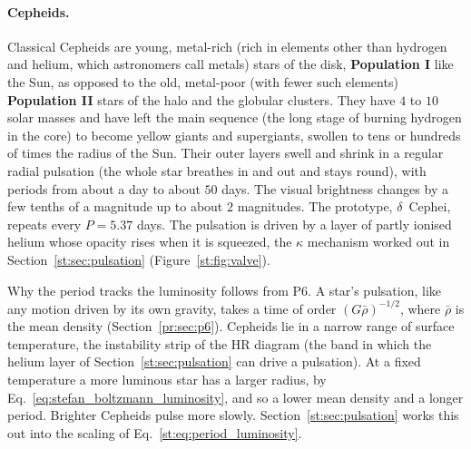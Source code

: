 \paragraph{Cepheids.} Classical Cepheids are young, metal-rich (rich in elements other than hydrogen and helium, which astronomers call metals) stars of the disk, \textbf{Population I} like the Sun, as opposed to the old, metal-poor (with fewer such elements) \textbf{Population II} stars of the halo and the globular clusters. They have $4$ to $10$ solar masses and have left the main sequence (the long stage of burning hydrogen in the core) to become yellow giants and supergiants, swollen to tens or hundreds of times the radius of the Sun. Their outer layers swell and shrink in a regular radial pulsation (the whole star breathes in and out and stays round), with periods from about a day to about $50$ days. The visual brightness changes by a few tenths of a magnitude up to about $2$ magnitudes. The prototype, $\delta$~Cephei, repeats every $P=5.37$ days. The pulsation is driven by a layer of partly ionised helium whose opacity rises when it is squeezed, the $\kappa$ mechanism worked out in Section~\ref{st:sec:pulsation} (Figure~\ref{st:fig:valve}).

Why the period tracks the luminosity follows from P6. A star's pulsation, like any motion driven by its own gravity, takes a time of order $(G\bar\rho)^{-1/2}$, where $\bar\rho$ is the mean density (Section~\ref{pr:sec:p6}). Cepheids lie in a narrow range of surface temperature, the instability strip of the HR diagram (the band in which the helium layer of Section~\ref{st:sec:pulsation} can drive a pulsation). At a fixed temperature a more luminous star has a larger radius, by Eq.~\eqref{eq:stefan_boltzmann_luminosity}, and so a lower mean density and a longer period. Brighter Cepheids pulse more slowly. Section~\ref{st:sec:pulsation} works this out into the scaling of Eq.~\eqref{st:eq:period_luminosity}.

